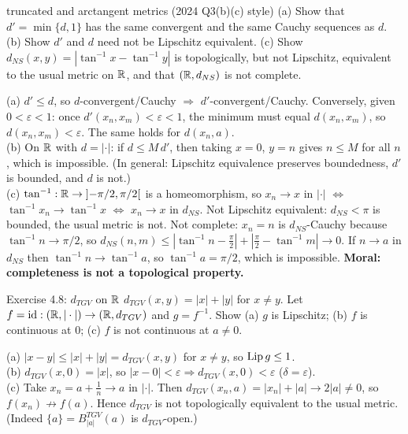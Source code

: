 \begin{exam}{truncated and arctangent metrics (2024 Q3(b)(c) style)}
(a) Show that $d'=\min\{d,1\}$ has the same convergent and the same Cauchy sequences as $d$.
(b) Show $d'$ and $d$ need not be Lipschitz equivalent.
(c) Show $d_{NS}(x,y)=|\tan^{-1}x-\tan^{-1}y|$ is topologically, but not Lipschitz, equivalent
to the usual metric on $\mathbb R$, and that $(\mathbb R,d_{NS})$ is not complete.
\end{exam}
\begin{answer}
(a) $d'\le d$, so $d$-convergent/Cauchy $\Rightarrow$ $d'$-convergent/Cauchy. Conversely, given
$0<\varepsilon<1$: once $d'(x_n,x_m)<\varepsilon<1$, the minimum must equal $d(x_n,x_m)$, so
$d(x_n,x_m)<\varepsilon$. The same holds for $d(x_n,a)$.\\
(b) On $\mathbb R$ with $d=|\cdot|$: if $d\le M\,d'$, then taking $x=0$, $y=n$ gives $n\le M$ for all
$n$, which is impossible. (In general: Lipschitz equivalence preserves boundedness, $d'$ is
bounded, and $d$ is not.)\\
(c) $\tan^{-1}:\mathbb R\to\mathopen{]}-\pi/2,\pi/2\mathclose{[}$ is a homeomorphism, so $x_n\to x$ in $|\cdot|$ $\iff$
$\tan^{-1}x_n\to\tan^{-1}x$ $\iff$ $x_n\to x$ in $d_{NS}$. Not Lipschitz equivalent: $d_{NS}<\pi$
is bounded, the usual metric is not. Not complete: $x_n=n$ is $d_{NS}$-Cauchy because
$\tan^{-1}n\to\pi/2$, so $d_{NS}(n,m)\le|\tan^{-1}n-\frac\pi2|+|\frac\pi2-\tan^{-1}m|\to0$. If
$n\to a$ in $d_{NS}$ then $\tan^{-1}n\to\tan^{-1}a$, so $\tan^{-1}a=\pi/2$, which is impossible.
\textbf{Moral: completeness is not a topological property.}
\end{answer}

\begin{exam}{Exercise 4.8: $d_{TGV}$ on $\mathbb R$}
$d_{TGV}(x,y)=|x|+|y|$ for $x\ne y$. Let $f=\operatorname{id}:(\mathbb R,|\cdot|)\to(\mathbb R,d_{TGV})$ and $g=f^{-1}$.
Show (a) $g$ is Lipschitz; (b) $f$ is continuous at $0$; (c) $f$ is not continuous at $a\ne0$.
\end{exam}
\begin{answer}
(a) $|x-y|\le|x|+|y|=d_{TGV}(x,y)$ for $x\ne y$, so $\operatorname{Lip} g\le1$.\\
(b) $d_{TGV}(x,0)=|x|$, so $|x-0|<\varepsilon\Rightarrow d_{TGV}(x,0)<\varepsilon$ ($\delta=\varepsilon$).\\
(c) Take $x_n=a+\frac1n\to a$ in $|\cdot|$. Then $d_{TGV}(x_n,a)=|x_n|+|a|\to2|a|\ne0$, so
$f(x_n)\not\to f(a)$. Hence $d_{TGV}$ is not topologically equivalent to the usual metric.
(Indeed $\{a\}=B^{TGV}_{|a|}(a)$ is $d_{TGV}$-open.)
\end{answer}

